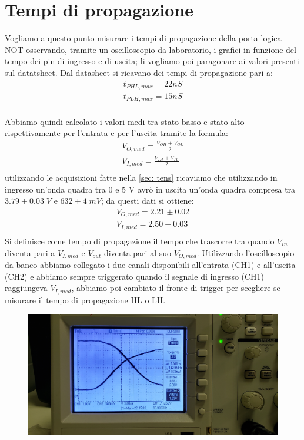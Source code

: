 \documentclass[10pt, a4paper, italian]{article}
\begin{document}
\section{Tempi di propagazione}
Vogliamo a questo punto misurare i tempi di propagazione della porta logica NOT osservando, tramite un oscilloscopio da laboratorio, i grafici in funzione del tempo dei pin di ingresso e di uscita; li vogliamo poi paragonare ai valori presenti sul datatsheet.
Dal datasheet si ricavano dei tempi di propagazione pari a:
\begin{gather*}
    t_{PHL,max}=22 nS\\
    t_{PLH,max}=15 nS\\
\end{gather*}

Abbiamo quindi calcolato i valori medi tra stato basso e stato alto rispettivamente per l'entrata e per l'uscita tramite la formula:
\begin{gather*}
V_{O,med}=\frac{V_{OH}+V_{OL}}{2}\\
V_{I,med}=\frac{V_{IH}+V_{IL}}{2}\\
\end{gather*}
utilizzando le acquisizioni fatte nella \cref{sec: tens} ricaviamo che utilizzando in ingresso un'onda quadra tra 0 e 5 V avrò in uscita un'onda quadra compresa tra $3.79 \pm 0.03 \; V$ e $ 632 \pm 4 \; mV$; da questi dati si ottiene:
\begin{gather*}
V_{O,med}=2.21 \pm 0.02\\
V_{I,med}=2.50 \pm 0.03\\
\end{gather*}
Si definisce come tempo di propagazione il tempo che trascorre tra quando $V_{in}$ diventa pari a $V_{I,med}$ e $V_{out}$ diventa pari al suo $V_{O,med}$.
Utilizzando l'oscilloscopio da banco abbiamo collegato i due canali disponibili all'entrata (CH1) e all'uscita (CH2) e abbiamo sempre triggerato quando il segnale di ingresso (CH1) raggiungeva $V_{I,med}$, abbiamo poi cambiato il fronte di trigger per scegliere se misurare il tempo di propagazione HL o LH.
\begin{figure}
	\includegraphics[width=\textwidth]{LH1}
\end{figure}
\end{document}

